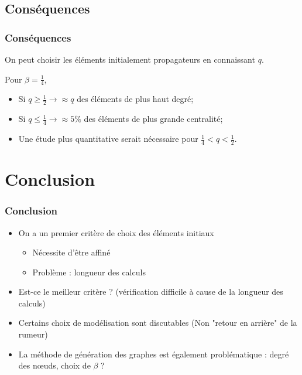 \documentclass{beamer}
\begin{document}
\subsection{Conséquences}
\begin{frame}
  \frametitle{Conséquences}

  \begin{alertblock}{}
  \begin{center}
    On peut choisir les éléments initialement propagateurs en connaissant $q$.
  \end{center}
  \end{alertblock}
  Pour $\beta=\frac{1}{4}$,
  \begin{itemize}
    \item<2-> Si $q \geq \frac{1}{2} \rightarrow \approx q$ des éléments de plus haut degré;
    \item<3-> Si $q \leq \frac{1}{4} \rightarrow \approx 5\%$ des éléments de plus grande centralité;
    \item<4-> Une étude plus quantitative serait nécessaire pour $\frac{1}{4} < q < \frac{1}{2}$.
  \end{itemize}
\end{frame}
\section{Conclusion}
\begin{frame}
  \frametitle{Conclusion}
  \begin{itemize}
    \item<1->On a un premier critère de choix des éléments initiaux 
    \begin{itemize}
      \item<2->Nécessite d'être affiné
      \item<3->Problème : longueur des calculs
    \end{itemize}
    \item<4->Est-ce le meilleur critère ? (vérification difficile à cause de la longueur des calculs)
    \item<5->Certains choix de modélisation sont discutables (Non "retour en arrière" de la rumeur)
    \item<6->La méthode de génération des graphes est également problématique : degré des nœuds, choix de $\beta$ ?
  \end{itemize}
\end{frame}

\appendix
\end{document}

